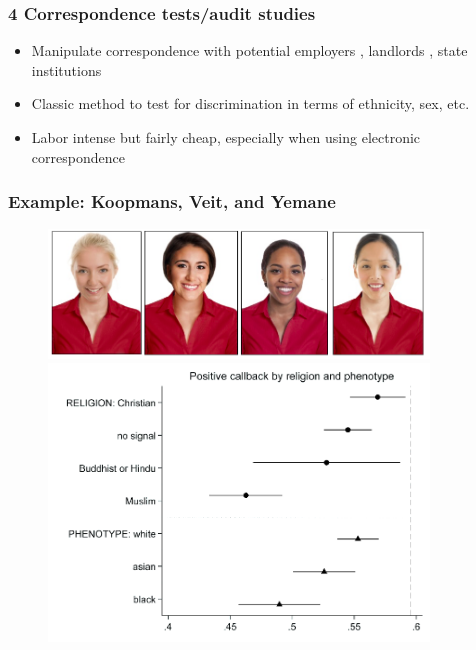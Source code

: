 \documentclass[12pt,english,dvipsnames,aspectratio=169,handout]{beamer}\usepackage[]{graphicx}\usepackage[]{xcolor}
\begin{document}
\begin{frame}
	\frametitle{4 Correspondence tests/audit studies}
	\footnotesize
\begin{itemize}
  \item Manipulate correspondence with potential employers \cite{bertrand_are_2004}, landlords \cite{bartos_attention_2016}, state institutions \cite{hemker_multiple_2017}
  \item Classic method to test for discrimination in terms of ethnicity, sex, etc. 
  \item Labor intense but fairly cheap, especially when using electronic correspondence
\end{itemize}
\vspace{3cm}
\end{frame}


\begin{frame}
	\frametitle{Example: Koopmans, Veit, and Yemane \citeyear{koopmans_taste_2019} }
    \begin{figure}[t]
        \begin{minipage}[b]{0.5\linewidth}
            \centering
            \includegraphics[width=0.9\textwidth]{../04-figures/12/15-w12_correpondence2}
        \end{minipage}
        \hspace{0.5cm}
        \begin{minipage}[b]{0.5\linewidth}
            \centering
            \includegraphics[width=0.9\textwidth]{../04-figures/12/16-w12_correpondence1}
        \end{minipage}
    \end{figure}
\end{frame}
\end{document}
